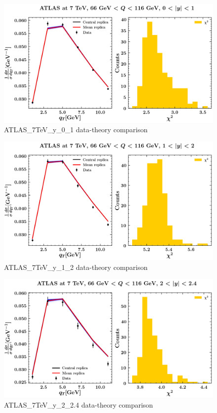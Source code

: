 \documentclass[
]{article}
\begin{document}
\begin{figure}
\centering
\includegraphics{pngplots/ATLAS_7TeV_y_0_1.png}
\caption{ATLAS\_7TeV\_y\_0\_1 data-theory comparison}
\end{figure}

\begin{figure}
\centering
\includegraphics{pngplots/ATLAS_7TeV_y_1_2.png}
\caption{ATLAS\_7TeV\_y\_1\_2 data-theory comparison}
\end{figure}

\begin{figure}
\centering
\includegraphics{pngplots/ATLAS_7TeV_y_2_2.4.png}
\caption{ATLAS\_7TeV\_y\_2\_2.4 data-theory comparison}
\end{figure}
\end{document}
